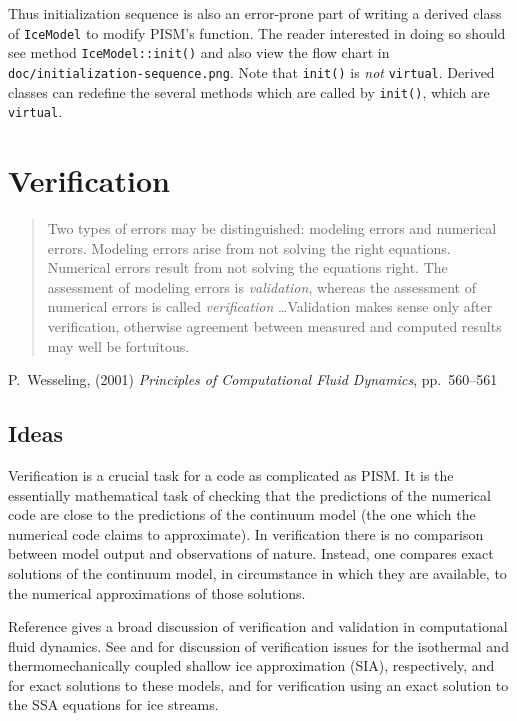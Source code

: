 \documentclass[11pt,final]{amsart}
\begin{document}
Thus initialization sequence is also an error-prone part of writing a derived class of \verb|IceModel| to modify PISM's function.  The reader interested in doing so should see method \verb|IceModel::init()| and also view the flow chart in \verb|doc/initialization-sequence.png|.  Note that \verb|init()| is \emph{not} \verb|virtual|.  Derived classes can redefine the several methods which are called by \verb|init()|, which are \verb|virtual|.


\clearpage\newpage



\clearpage\newpage
\section{Verification}\label{sect:verif}

\bigskip
\begin{quote}  Two types of errors may be distinguished: modeling errors and numerical errors.  Modeling errors arise from not solving the right equations.  Numerical errors result from not solving the equations right.  The assessment of modeling errors is \emph{validation}, whereas the assessment of numerical errors is called \emph{verification} \dots  Validation makes sense only after verification, otherwise agreement between measured and computed results may well be fortuitous.
\end{quote}
\hfill P.~Wesseling, (2001)  \emph{Principles of Computational Fluid Dynamics}, pp.~560--561 \cite{Wesseling}
\bigskip

\subsection{Ideas}  Verification is a crucial task for a code as complicated as PISM.  It is the essentially mathematical task of checking that the predictions of the numerical code are close to the predictions of the continuum model (the one which the numerical code claims to approximate).  In verification there is no comparison between model output and observations of nature.  Instead, one compares exact solutions of the continuum model, in circumstance in which they are available, to the numerical approximations of those solutions.

Reference \cite{Roache} gives a broad discussion of verification and validation in computational fluid dynamics. See \cite{BLKCB} and \cite{BBL} for discussion of verification issues for the isothermal and thermomechanically coupled shallow ice approximation (SIA), respectively, and for exact solutions to these models, and \cite{BBssasliding,SchoofStream} for verification using an exact solution to the SSA equations for ice streams.  
\end{document}
